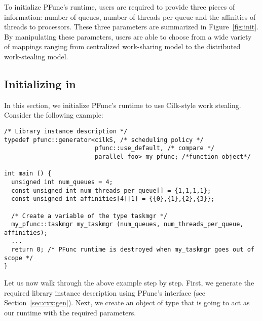 To initialize PFunc's runtime, users are required to provide three pieces of
information: number of queues, number of threads per queue and the affinities
of threads to processors. These three parameters are summarized in
Figure~\ref{fig:init}.  By manipulating these parameters, users are able to
choose from a wide variety of mappings ranging from centralized work-sharing
model to the distributed work-stealing model. 

\subsection{Initializing in \Cpp{}}
\label{sec:cxx:init}
In this section, we initialize PFunc's runtime to use Cilk-style work stealing.
Consider the following example:

\begin{lstlisting}
/* Library instance description */
typedef pfunc::generator<cilkS, /* scheduling policy */
                         pfunc::use_default, /* compare */
                         parallel_foo> my_pfunc; /*function object*/

int main () {
  unsigned int num_queues = 4;
  const unsigned int num_threads_per_queue[] = {1,1,1,1};
  const unsigned int affinities[4][1] = {{0},{1},{2},{3}};

  /* Create a variable of the type taskmgr */
  my_pfunc::taskmgr my_taskmgr (num_queues, num_threads_per_queue, affinities);
  ...
  return 0; /* PFunc runtime is destroyed when my_taskmgr goes out of scope */
}
\end{lstlisting}

Let us now walk through the above example step by step. First, we generate the
required library instance description using PFunc's  interface
(see Section~\ref{sec:cxx:gen}). Next, we create an object of type
 that is going to act as our runtime with the required
parameters. 

